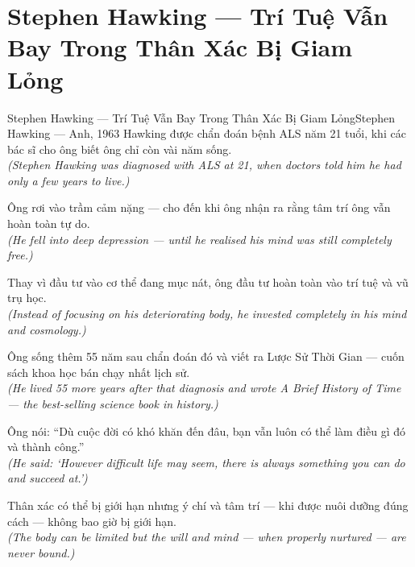\section{Stephen Hawking --- Trí Tuệ Vẫn Bay Trong Thân Xác Bị Giam Lỏng}
\begin{truyen}{Stephen Hawking --- Trí Tuệ Vẫn Bay Trong Thân Xác Bị Giam Lỏng}{Stephen Hawking --- Anh, 1963}
 Hawking được chẩn đoán bệnh ALS năm 21 tuổi, khi các bác sĩ cho ông biết ông chỉ còn vài năm sống.\\[4pt]
\textit{(Stephen Hawking was diagnosed with ALS at 21, when doctors told him he had only a few years to live.)}

Ông rơi vào trầm cảm nặng --- cho đến khi ông nhận ra rằng tâm trí ông vẫn hoàn toàn tự do.\\[4pt]
\textit{(He fell into deep depression --- until he realised his mind was still completely free.)}

Thay vì đầu tư vào cơ thể đang mục nát, ông đầu tư hoàn toàn vào trí tuệ và vũ trụ học.\\[4pt]
\textit{(Instead of focusing on his deteriorating body, he invested completely in his mind and cosmology.)}

Ông sống thêm 55 năm sau chẩn đoán đó và viết ra Lược Sử Thời Gian --- cuốn sách khoa học bán chạy nhất lịch sử.\\[4pt]
\textit{(He lived 55 more years after that diagnosis and wrote A Brief History of Time --- the best-selling science book in history.)}

Ông nói: ``Dù cuộc đời có khó khăn đến đâu, bạn vẫn luôn có thể làm điều gì đó và thành công.''\\[4pt]
\textit{(He said: `However difficult life may seem, there is always something you can do and succeed at.')}

\end{truyen}
\begin{baihoc}
  Thân xác có thể bị giới hạn nhưng ý chí và tâm trí --- khi được nuôi dưỡng đúng cách --- không bao giờ bị giới hạn.\\[4pt]
  \textit{(The body can be limited but the will and mind --- when properly nurtured --- are never bound.)}
\end{baihoc}

